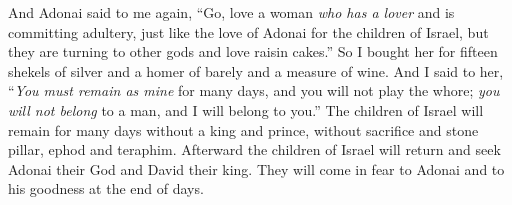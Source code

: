 \begin{biblechapter} %
 And Adonai said to me again, 
“Go, love a woman 
\textit{who has a lover} and is committing adultery, 
just like the love of Adonai for the children of Israel, 
but they are turning to other gods 
and love raisin cakes.”
\verse So I bought her for fifteen shekels of silver 
and a homer of barely and a measure of wine.
\verse And I said to her, 
“\textit{You must remain as mine} for many days, 
and you will not play the whore; 
\textit{you will not belong} to a man, 
and I will belong to you.”
\verse The children of Israel will remain for many days 
without a king and prince, 
without sacrifice and stone pillar, ephod and teraphim.
\verse Afterward the children of Israel will return 
and seek Adonai their God and David their king. 
They will come in fear to Adonai 
and to his goodness at the end of days.
\end{biblechapter}


